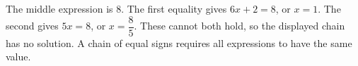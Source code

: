 The middle expression is $8$. The first equality gives $6x+2=8$, or $x=1$. The second gives $5x=8$, or $x=\dfrac{8}{5}$. These cannot both hold, so the displayed chain has no solution. A chain of equal signs requires all expressions to have the same value.
